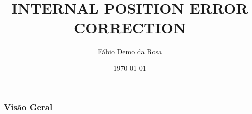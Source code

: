 \documentclass[xcolor=dvipsnames, aspectratio=169]{beamer}
\title[INTERNAL POSITION ERROR CORRECTION]{INTERNAL POSITION ERROR CORRECTION} %
\author[FDR]{Fábio Demo da Rosa} %
\institute[UFSM] %
{
Universidade Federal de Santa Maria \\ %
Pós-Graduação em Ciência da Computação \\
Disciplina de Robótica Móvel\\
\medskip
\textit{faberdemo@gmail.com} %
}
\date{\today} %
\begin{document}
\begin{frame}
\titlepage %
\end{frame}

\begin{frame}
\frametitle{Visão Geral} %
\tableofcontents %
\end{frame}


\end{document}
